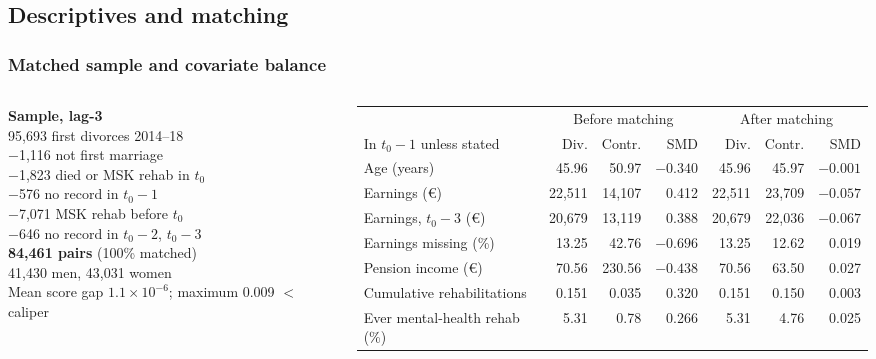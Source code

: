 \documentclass[t,20pt]{beamer}
\newcommand{\hl}[1]{\textcolor{BiBViolett}{\textbf{#1}}}           %
\begin{document}
\subsection{Descriptives and matching}
\begin{bibframe}
  \frametitle{Matched sample and covariate balance}
  \begin{columns}[T]
    \begin{column}{8.6cm}
      {\small
      \textbf{Sample, lag-3}\\[0.2cm]
      95,693 first divorces 2014--18\\
      $-$1,116 not first marriage\\
      $-$1,823 died or MSK rehab in $t_0$\\
      $-$576 no record in $t_0-1$\\
      $-$7,071 MSK rehab before $t_0$\\
      $-$646 no record in $t_0-2$, $t_0-3$\\[0.2cm]
      \hl{84,461 pairs} (100\% matched)\\
      41,430 men, 43,031 women\\[0.2cm]
      Mean score gap $1.1\times10^{-6}$; maximum 0.009 $<$ caliper
      }
    \end{column}
    \begin{column}{20.4cm}
      {\small
      \setlength{\tabcolsep}{4pt}
      \begin{tabular}{@{}lrrrrrr@{}}
        \toprule
        & \multicolumn{3}{c}{Before matching} & \multicolumn{3}{c}{After matching} \\
        \cmidrule(lr){2-4}\cmidrule(l){5-7}
        In $t_0-1$ unless stated & Div. & Contr. & SMD & Div. & Contr. & SMD \\
        \midrule
        Age (years) & 45.96 & 50.97 & $-0.340$ & 45.96 & 45.97 & $-0.001$ \\
        Earnings (€) & 22,511 & 14,107 & 0.412 & 22,511 & 23,709 & $-0.057$ \\
        Earnings, $t_0-3$ (€) & 20,679 & 13,119 & 0.388 & 20,679 & 22,036 & $-0.067$ \\
        Earnings missing (\%) & 13.25 & 42.76 & $-0.696$ & 13.25 & 12.62 & 0.019 \\
        Pension income (€) & 70.56 & 230.56 & $-0.438$ & 70.56 & 63.50 & 0.027 \\
        Cumulative rehabilitations & 0.151 & 0.035 & 0.320 & 0.151 & 0.150 & 0.003 \\
        Ever mental-health rehab (\%) & 5.31 & 0.78 & 0.266 & 5.31 & 4.76 & 0.025 \\

\end{tabular}}
\end{column}
\end{columns}
\end{bibframe}
\end{document}
